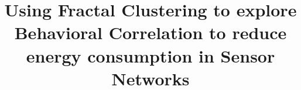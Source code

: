 \documentclass{acm_proc_article-sp}
\begin{document}
%

\title{Using Fractal Clustering to explore Behavioral Correlation to
reduce energy consumption in Sensor Networks}



\maketitle
\end{document}
